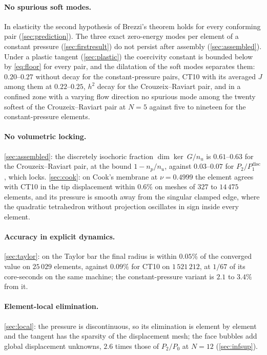 \documentclass{article}
\theoremstyle{definition}
\theoremstyle{plain}
\begin{document}
\paragraph{No spurious soft modes.} In elasticity the second hypothesis of
Brezzi's theorem holds for every conforming pair (\cref{sec:prediction}). The
three exact zero-energy modes per element of a constant pressure
(\cref{sec:firstresult}) do not persist after assembly
(\cref{sec:assembled}). Under a plastic tangent (\cref{sec:plastic}) the
coercivity constant is bounded below by \eqref{eq:floor} for every pair, and
the dilatation of the soft modes separates them: $0.20$--$0.27$ without
decay for the constant-pressure pairs, CT10 with its
averaged $J$ among them at $0.22$--$0.25$, $h^2$ decay for the
Crouzeix--Raviart pair, and in a confined zone with a varying flow direction
no spurious mode among the twenty softest of the Crouzeix--Raviart pair at
$N = 5$ against five to nineteen for the constant-pressure elements.

\paragraph{No volumetric locking.} \cref{sec:assembled}: the discretely
isochoric fraction $\dim\ker ~G / n_u$ is $0.61$--$0.63$ for the
Crouzeix--Raviart pair, at the bound $1 - n_p/n_u$, against
$0.03$--$0.07$ for $P_2/P_1^{\mathrm{disc}}$, which locks. \cref{sec:cook}:
on Cook's membrane at $\nu = 0.4999$ the element agrees with CT10 in the tip displacement within $0.6\%$ on meshes of $327$ to
$14\,475$ elements, and its pressure is smooth away from the singular
clamped edge, where the quadratic tetrahedron without projection oscillates
in sign inside every element.

\paragraph{Accuracy in explicit dynamics.} \cref{sec:taylor}: on the
Taylor bar the final radius is within $0.05\%$ of the converged value on
$25\,029$ elements, against $0.09\%$ for CT10 on
$1\,521\,212$, at $1/67$ of its core-seconds on the same machine; the
constant-pressure variant is $2.1$ to $3.4\%$ from it.

\paragraph{Element-local elimination.} \cref{sec:local}: the pressure is
discontinuous, so its elimination is element by element and the tangent has
the sparsity of the displacement mesh; the face bubbles add global
displacement unknowns, $2.6$ times those of $P_2/P_0$ at $N = 12$
(\cref{sec:infsup}).
\end{document}
